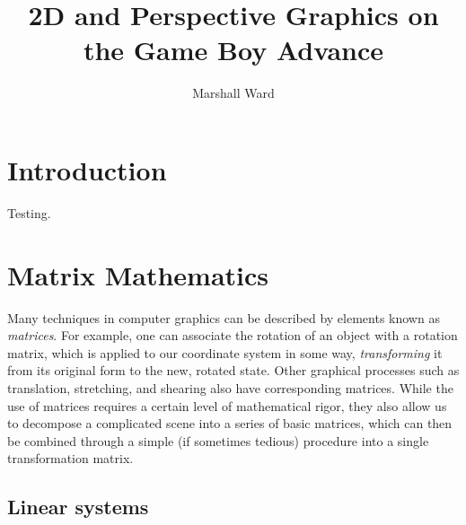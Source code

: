 \documentclass[letterpaper, 10pt]{report}
\title{2D and Perspective Graphics on the Game Boy Advance}
\author{Marshall Ward}
\begin{document}
\maketitle

\chapter{Introduction}

Testing.


\chapter{Matrix Mathematics}

Many techniques in computer graphics can be described by elements known as \emph{matrices}. For example, one can associate the rotation of an object with a rotation matrix, which is applied to our coordinate system in some way, \emph{transforming} it from its original form to the new, rotated state. Other graphical processes such as translation, stretching, and shearing also have corresponding matrices. While the use of matrices requires a certain level of mathematical rigor, they also allow us to decompose a complicated scene into a series of basic matrices, which can then be combined through a simple (if sometimes tedious) procedure into a single transformation matrix.


\section{Linear systems}
\end{document}
